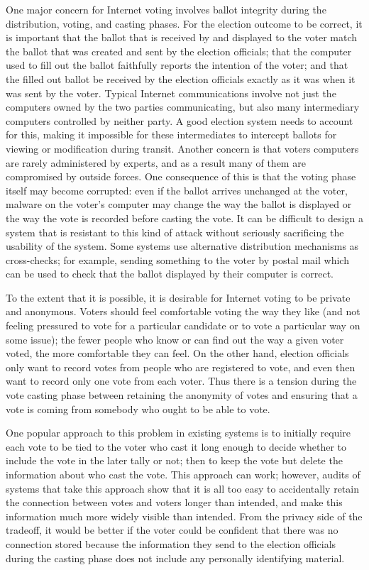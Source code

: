 One major concern for Internet voting involves ballot integrity during the
distribution, voting, and casting phases. For the election outcome to be
correct, it is important that the ballot that is received by and displayed
to the voter match the ballot that was created and sent by the election
officials; that the computer used to fill out the ballot faithfully reports
the intention of the voter; and that the filled out ballot be received by
the election officials exactly as it was when it was sent by the voter.
Typical Internet communications involve not just the computers owned by the
two parties communicating, but also many intermediary computers controlled
by neither party. A good election system needs to account for this, making
it impossible for these intermediates to intercept ballots for viewing or
modification during transit. Another concern is that voters computers are
rarely administered by experts, and as a result many of them are compromised
by outside forces. One consequence of this is that the voting phase itself
may become corrupted: even if the ballot arrives unchanged at the voter,
malware on the voter's computer may change the way the ballot is displayed
or the way the vote is recorded before casting the vote. It can be difficult
to design a system that is resistant to this kind of attack without
seriously sacrificing the usability of the system. Some systems use
alternative distribution mechanisms as cross-checks; for example, sending
something to the voter by postal mail which can be used to check that the
ballot displayed by their computer is correct.

To the extent that it is possible, it is desirable for Internet voting to be
private and anonymous. Voters should feel comfortable voting the way they
like (and not feeling pressured to vote for a particular candidate or to
vote a particular way on some issue); the fewer people who know or can find
out the way a given voter voted, the more comfortable they can feel. On the
other hand, election officials only want to record votes from people who are
registered to vote, and even then want to record only one vote from each
voter. Thus there is a tension during the vote casting phase between
retaining the anonymity of votes and ensuring that a vote is coming from
somebody who ought to be able to vote.

One popular approach to this problem in existing systems is to initially
require each vote to be tied to the voter who cast it long enough to decide
whether to include the vote in the later tally or not; then to keep the vote
but delete the information about who cast the vote. This approach can work;
however, audits of systems that take this approach show that it is all too
easy to accidentally retain the connection between votes and voters longer
than intended, and make this information much more widely visible than
intended. From the privacy side of the tradeoff, it would be better if the
voter could be confident that there was no connection stored because the
information they send to the election officials during the casting phase
does not include any personally identifying material.

